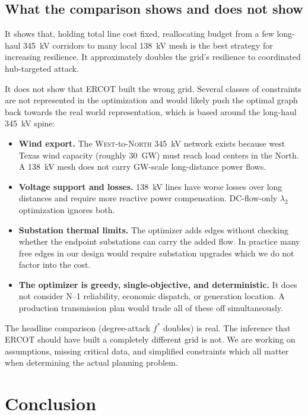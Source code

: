 \documentclass[12pt,letterpaper]{article}
\begin{document}
\subsection{What the comparison shows and does not show}

It shows that, holding total line cost fixed, reallocating budget from a few long-haul 345~kV corridors to many local 138~kV mesh is the best strategy for increasing resilience. It approximately doubles the grid's resilience to coordinated hub-targeted attack.

It does not show that ERCOT built the wrong grid. Several classes of constraints are not represented in the optimization and would likely push the optimal graph back towards the real world representation, which is based around the long-haul 345~kV spine:

\begin{itemize}
    \item \textbf{Wind export.} The \textsc{West}-to-\textsc{North} 345~kV network exists because west Texas wind capacity (roughly 30~GW) must reach load centers in the North. A 138~kV mesh does not carry GW-scale long-distance power flows.
    \item \textbf{Voltage support and losses.} 138~kV lines have worse losses over long distances and require more reactive power compensation. DC-flow-only $\lambda_2$ optimization ignores both.
    \item \textbf{Substation thermal limits.} The optimizer adds edges without checking whether the endpoint substations can carry the added flow. In practice many free edges in our design would require substation upgrades which we do not factor into the cost.
    \item \textbf{The optimizer is greedy, single-objective, and deterministic.} It does not consider N--1 reliability, economic dispatch, or generation location. A production transmission plan would trade all of these off simultaneously.
\end{itemize}

The headline comparison (degree-attack $f^*$ doubles) is real. The inference that ERCOT should have built a completely different grid is not. We are working on assumptions, missing critical data, and simplified constraints which all matter when determining the actual planning problem.

\section{Conclusion}
\end{document}
